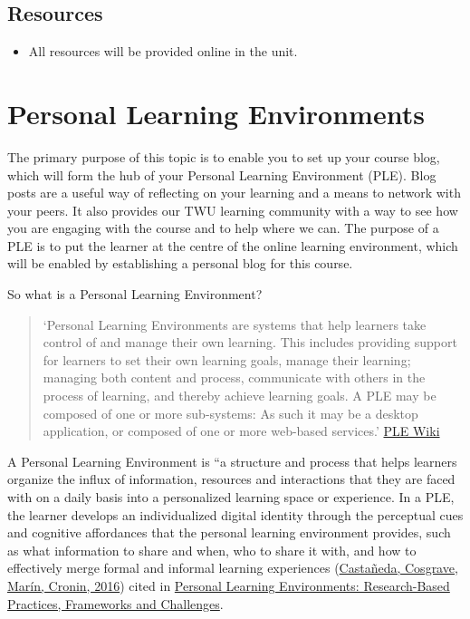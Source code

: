 \documentclass[
]{book}
\providecommand{\tightlist}{%
  \setlength{\itemsep}{0pt}\setlength{\parskip}{0pt}}
\theoremstyle{definition}
\theoremstyle{definition}
\theoremstyle{definition}
\theoremstyle{definition}
\theoremstyle{remark}
\begin{document}
\hypertarget{resources-3}{%
\subsection*{Resources}\label{resources-3}}

\begin{itemize}
\tightlist
\item
  All resources will be provided online in the unit.
\end{itemize}

\hypertarget{personal-learning-environments}{%
\section{Personal Learning Environments}\label{personal-learning-environments}}

The primary purpose of this topic is to enable you to set up your course blog, which will form the hub of your Personal Learning Environment (PLE). Blog posts are a useful way of reflecting on your learning and a means to network with your peers. It also provides our TWU learning community with a way to see how you are engaging with the course and to help where we can. The purpose of a PLE is to put the learner at the centre of the online learning environment, which will be enabled by establishing a personal blog for this course.

So what is a Personal Learning Environment?

\begin{quote}
`Personal Learning Environments are systems that help learners take control of and manage their own learning. This includes providing support for learners to set their own learning goals, manage their learning; managing both content and process, communicate with others in the process of learning, and thereby achieve learning goals. A PLE may be composed of one or more sub-systems: As such it may be a desktop application, or composed of one or more web-based services.' \href{https://edutechwiki.unige.ch/en/Personal_learning_environment}{PLE Wiki}
\end{quote}

A Personal Learning Environment is ``a structure and process that helps learners organize the influx of information, resources and interactions that they are faced with on a daily basis into a personalized learning space or experience. In a PLE, the learner develops an individualized digital identity through the perceptual cues and cognitive affordances that the personal learning environment provides, such as what information to share and when, who to share it with, and how to effectively merge formal and informal learning experiences (\href{https://naerjournal.ua.es/article/view/v6n1-introduction\#}{Castañeda, Cosgrave, Marín, Cronin, 2016}) cited in \href{https://naerjournal.ua.es/article/view/v6n1-introduction}{Personal Learning Environments: Research-Based Practices, Frameworks and Challenges}.
\end{document}
